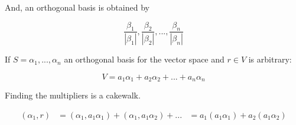 \begin{enumerate}
  And, an orthogonal basis is obtained by

  \begin{equation}
    {\frac{\beta_1}{|\beta_1|}, \frac{\beta_2}{|\beta_2|}, ..., \frac{\beta_n}{|\beta_n|}}  
  \end{equation}

  If $S = {\alpha_1, ..., \alpha_n}$ an orthogonal basis for the vector space and $r \in V$ is arbitrary:

  \begin{equation}
    V = a_1\alpha_1 + a_2\alpha_2 + ... + a_n\alpha_n
  \end{equation}

  Finding the multipliers is a cakewalk.

  \begin{align*}
    (\alpha_1, r) &= (\alpha_1, a_1\alpha_1) + (\alpha_1, a_1\alpha_2) + ...
                  &= a_1(a_1\alpha_1) + a_2(a_1\alpha_2)
  \end{align*}

 \end{enumerate} 